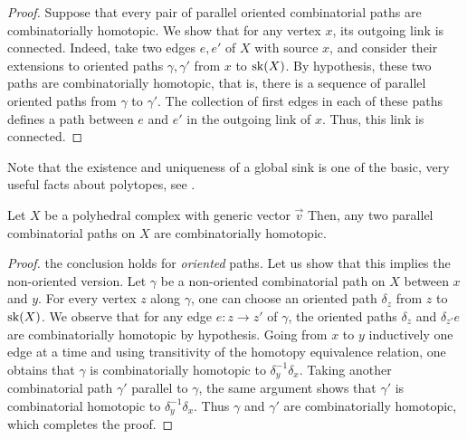 \begin{proof}
    Suppose that every pair of parallel oriented combinatorial paths are combinatorially homotopic. 
    We show that for any vertex $x$, its outgoing link is  connected. 
    Indeed, take two edges $e,e'$ of $X$ with source $x$, and consider their extensions to oriented paths $\gamma, \gamma'$ from $x$ to $\mathrm{sk}(X)$. 
    By hypothesis, these two paths are combinatorially homotopic, that is, there is a sequence of parallel oriented paths from $\gamma$ to $\gamma'$. 
    The collection of first edges in each of these paths defines a  path between $e$ and $e'$ in the outgoing link of $x$. 
    Thus, this link is  connected. 
\end{proof}

\begin{rem}
    Note that the existence and uniqueness of a global sink is one of the basic, very useful facts about polytopes, see \cite[Thm.~3.7]{Ziegler95}.
\end{rem}

\begin{thm}
\label{p:second-proof}
    Let $X$ be a polyhedral complex with generic vector $\vec v$ 
    Then, any two parallel combinatorial paths on $X$ are combinatorially homotopic.
\end{thm}

\begin{proof} 
     the conclusion holds for \emph{oriented} paths.  
    Let us show that this implies the non-oriented version.
    Let $\gamma$ be a non-oriented combinatorial path on $X$ between $x$ and $y$.
    For every vertex $z$ along $\gamma$, one can choose an oriented path $\delta_z$ from $z$ to $\mathrm{sk}(X)$. 
    We observe that for any edge $e: z \to z'$ of $\gamma$, the oriented paths $\delta_z$ and $\delta_{z'}e$ are combinatorially homotopic by hypothesis. 
    Going from $x$ to $y$ inductively one edge at a time and using transitivity of the homotopy equivalence relation, one obtains that $\gamma$ is combinatorially homotopic to $\delta_y^{-1}\delta_x$. 
    Taking another combinatorial path $\gamma'$ parallel to $\gamma$, the same argument shows that $\gamma'$ is combinatorial homotopic to $\delta_y^{-1}\delta_x$.
    Thus $\gamma$ and $\gamma'$ are combinatorially homotopic, which completes the proof. 
\end{proof}

